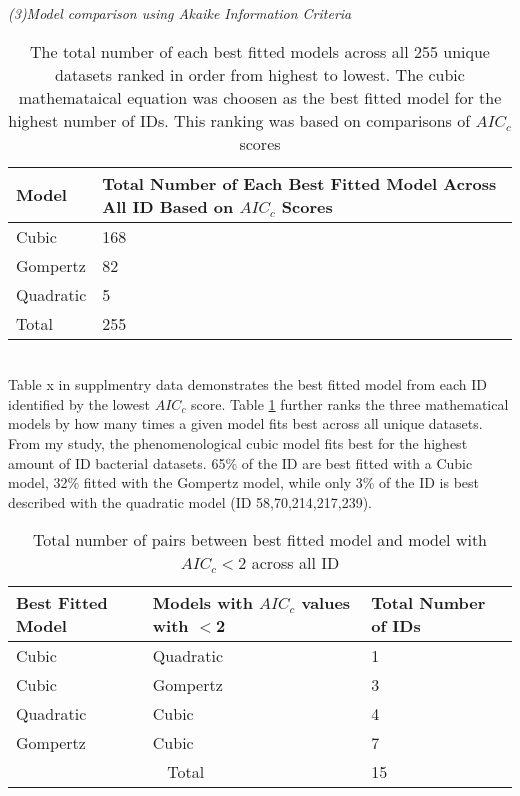 \documentclass[11pt]{article}
\begin{document}
\noindent\emph{(3)Model comparison using Akaike Information Criteria}\\
    \begin{table}[htb]
        \caption{The total number of each best fitted models across all 255 unique datasets ranked in order from highest to lowest. The cubic mathemataical equation was
        choosen as the best fitted model for the highest number of IDs. This ranking was based on comparisons of $AIC_{c}$ scores}
        \centering 
        \begin{tabular}{ | m{3cm} | m{12em} | }
            \hline
            Model & Total Number of Each Best Fitted Model Across All ID Based on $AIC_{c}$ Scores \\
            \hline
            Cubic & 168 \\ 
            \hline
            Gompertz & 82 \\
            \hline
            Quadratic & 5 \\
            \hline
            Total & 255 \\
            \hline
        \end{tabular}
    \label{table:1}
    \end{table} \\ 

Table x in supplmentry data demonstrates the best fitted model from each ID identified by the lowest $AIC_{c}$ score. Table \ref{table:1} further ranks
the three mathematical models by how many times a given model fits best across all unique datasets. From my study, the phenomenological cubic 
model fits best for the highest amount of ID bacterial datasets. 65\% of the ID are best fitted with a Cubic model, 32\% fitted with the 
Gompertz model, while only 3\% of the ID is best described with the quadratic model (ID 58,70,214,217,239). \\

    \begin{table}[htb]
        \caption{Total number of pairs between best fitted model and model with $AIC_{c}<$2 across all ID}
        \centering 
        \begin{tabular}{ | m{6em} | m{8em} | m{8em} |  }
            \hline
            Best Fitted Model & Models with $AIC_{c}$ values with $<$2 & Total Number of IDs \\
            \hline
            Cubic & Quadratic & 1 \\ 
            \hline
            Cubic & Gompertz & 3 \\
            \hline
            Quadratic & Cubic & 4 \\
            \hline
            Gompertz & Cubic & 7 \\
            \hline
            \multicolumn{2}{|c|}{Total} & 15 \\
            \hline
        \end{tabular}
    \label{table:2}
    \end{table} \\ 
\end{document}
